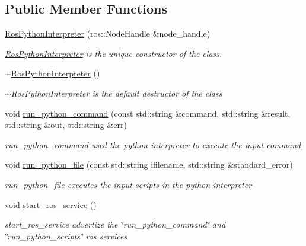 \subsection*{Public Member Functions}
\begin{DoxyCompactItemize}
\item 
\hyperlink{classdynamic__graph_1_1RosPythonInterpreter_a082493a5a7edd758b65a34fc9e617df5}{Ros\+Python\+Interpreter} (ros\+::\+Node\+Handle \&node\+\_\+handle)
\begin{DoxyCompactList}\small\item\em \hyperlink{classdynamic__graph_1_1RosPythonInterpreter}{Ros\+Python\+Interpreter} is the unique constructor of the class. \end{DoxyCompactList}\item 
\mbox{\label{classdynamic__graph_1_1RosPythonInterpreter_a45378e164f35c3cc8dffe1cca7473dde}} 
\hyperlink{classdynamic__graph_1_1RosPythonInterpreter_a45378e164f35c3cc8dffe1cca7473dde}{$\sim$\+Ros\+Python\+Interpreter} ()
\begin{DoxyCompactList}\small\item\em $\sim$\+Ros\+Python\+Interpreter is the default destructor of the class \end{DoxyCompactList}\item 
void \hyperlink{classdynamic__graph_1_1RosPythonInterpreter_a9745742713e7dc9302468519c1cae9a1}{run\+\_\+python\+\_\+command} (const std\+::string \&command, std\+::string \&result, std\+::string \&out, std\+::string \&err)
\begin{DoxyCompactList}\small\item\em run\+\_\+python\+\_\+command used the python interpreter to execute the input command \end{DoxyCompactList}\item 
void \hyperlink{classdynamic__graph_1_1RosPythonInterpreter_a4a90b557973b8aa533e297adab4bcbe6}{run\+\_\+python\+\_\+file} (const std\+::string ifilename, std\+::string \&standard\+\_\+error)
\begin{DoxyCompactList}\small\item\em run\+\_\+python\+\_\+file executes the input scripts in the python interpreter \end{DoxyCompactList}\item 
\mbox{\label{classdynamic__graph_1_1RosPythonInterpreter_ae6f58ecea63921945529f367c27dd70e}} 
void \hyperlink{classdynamic__graph_1_1RosPythonInterpreter_ae6f58ecea63921945529f367c27dd70e}{start\+\_\+ros\+\_\+service} ()
\begin{DoxyCompactList}\small\item\em start\+\_\+ros\+\_\+service advertize the \char`\"{}run\+\_\+python\+\_\+command\char`\"{} and \char`\"{}run\+\_\+python\+\_\+scripts\char`\"{} ros services \end{DoxyCompactList}\end{DoxyCompactItemize}

